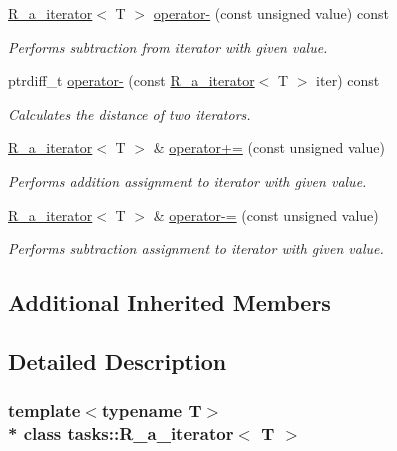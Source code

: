 \begin{DoxyCompactItemize}
\hyperlink{classtasks_1_1R__a__iterator}{R\+\_\+a\+\_\+iterator}$<$ T $>$ \hyperlink{classtasks_1_1R__a__iterator_a5ae2723c44551e340deeb75575b69b8a}{operator-\/} (const unsigned value) const 
\begin{DoxyCompactList}\small\item\em Performs subtraction from iterator with given value. \end{DoxyCompactList}\item 
ptrdiff\+\_\+t \hyperlink{classtasks_1_1R__a__iterator_ab4840764eb56f44bc59175ef56f5eb15}{operator-\/} (const \hyperlink{classtasks_1_1R__a__iterator}{R\+\_\+a\+\_\+iterator}$<$ T $>$ iter) const 
\begin{DoxyCompactList}\small\item\em Calculates the distance of two iterators. \end{DoxyCompactList}\item 
\hyperlink{classtasks_1_1R__a__iterator}{R\+\_\+a\+\_\+iterator}$<$ T $>$ \& \hyperlink{classtasks_1_1R__a__iterator_a73d2eb9a517e4467571655142a606bc1}{operator+=} (const unsigned value)
\begin{DoxyCompactList}\small\item\em Performs addition assignment to iterator with given value. \end{DoxyCompactList}\item 
\hyperlink{classtasks_1_1R__a__iterator}{R\+\_\+a\+\_\+iterator}$<$ T $>$ \& \hyperlink{classtasks_1_1R__a__iterator_a265ba9136ef4fa97e68d4761b70674be}{operator-\/=} (const unsigned value)
\begin{DoxyCompactList}\small\item\em Performs subtraction assignment to iterator with given value. \end{DoxyCompactList}\end{DoxyCompactItemize}
\subsection*{Additional Inherited Members}


\subsection{Detailed Description}
\subsubsection*{template$<$typename T$>$\\*
class tasks\+::\+R\+\_\+a\+\_\+iterator$<$ T $>$}

